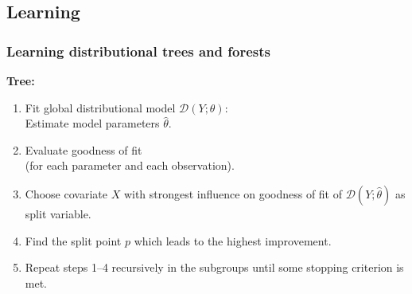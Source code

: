 \documentclass[11pt,t,usepdftitle=false,aspectratio=169]{beamer}
\begin{document}
\subsection{Learning}
\begin{frame}
   \frametitle{Learning distributional trees and forests}
      \begin{minipage}{0.7\textwidth}
   \vspace{-0.45em}
      {\bf Tree:}
      \begin{enumerate}
      \item<3-> Fit global distributional model $\mathcal{D}(Y; \theta)$: \\ %
      Estimate model parameters $\hat{\theta}$.
      \item<7-> Evaluate goodness of fit \\
      (for each parameter and each observation).
      \item<8-> Choose covariate $X$ with strongest influence on goodness of fit
        of $\mathcal{D}(Y; \hat{\theta})$ as split variable.
      \item<8-> Find the split point $p$ which leads to the highest improvement.
      \item<10-> Repeat steps 1--4 recursively in the subgroups
        until some stopping criterion is met.
      \end{enumerate}
    \vspace{0.05cm}
      \end{minipage}
      \begin{minipage}{0.23\textwidth}
      \vspace{-3.45cm}
\end{minipage}
\end{frame}
\end{document}
